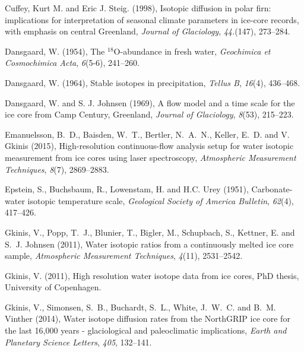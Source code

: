 \documentclass[draft, jgrga]{AGUTeX}
\begin{document}
\begin{article}
\begin{thebibliography}{}
Cuffey, Kurt M. and Eric J. Steig. (1998), Isotopic diffusion in polar firn: implications for interpretation of seasonal climate parameters in ice-core records, with emphasis on central Greenland, \textit{Journal of Glaciology}, \textit{44.}(147), 273--284.

 Dansgaard, W. (1954),
The $^{18}${O}-abundance in fresh water,
\textit{Geochimica et Cosmochimica Acta}, \textit{6}(5-6), 241--260.

 Dansgaard, W. (1964),
Stable isotopes in precipitation,
\textit{Tellus B}, \textit{16}(4), 436--468.

 Dansgaard, W. and S. J. Johnsen (1969), A flow model and a time scale for the ice core from Camp Century, Greenland, \textit{Journal of Glaciology}, \textit{8}(53), 215--223.

Emanuelsson, B.~D., Baisden, W.~T., Bertler, N.~A.~N., Keller, E.~D. and V. Gkinis (2015),
High-resolution continuous-flow analysis setup for water isotopic measurement from ice cores using laser spectroscopy,
\textit{Atmospheric Measurement Techniques}, \textit{8}(7), 2869--2883.

Epstein, S., Buchsbaum, R., Lowenstam, H. and H.C. Urey (1951),
Carbonate-water isotopic temperature scale,
\textit{Geological Society of America Bulletin}, \textit{62}(4), 417--426.

Gkinis, V., Popp, T.~J., Blunier, T., Bigler, M., Schupbach, S., Kettner, E. and S.~J. Johnsen (2011),
Water isotopic ratios from a continuously melted ice core sample,
\textit{Atmospheric Measurement Techniques}, \textit{4}(11), 2531--2542.

Gkinis, V. (2011),
{ High resolution water isotope data from ice cores},
PhD thesis, University of Copenhagen.

Gkinis, V., Simonsen, S.~B., Buchardt, S.~L., White, J.~W.~C. and  B.~M. Vinther (2014),
{Water isotope diffusion rates from the NorthGRIP ice core for the last 16,000 years - glaciological and paleoclimatic implications},
\textit{Earth and Planetary Science Letters}, \textit{405}, 132--141.


\end{thebibliography}
\end{article}
\end{document}
